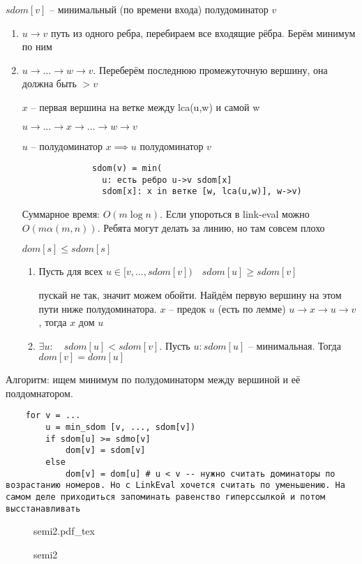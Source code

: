 \documentclass{book}
\theoremstyle{definition}
\newcommand{\incfig}[1]{%
    \def\svgwidth{\columnwidth}
    {#1.pdf_tex}
}
\begin{document}
$sdom[v]$ -- минимальный (по времени входа) полудоминатор  $v$

\begin{enumerate}
    \item $u\to v$ путь из одного ребра, перебираем все входящие рёбра. Берём минимум по ним
    \item $u\to \ldots\to w\to v$. Переберём последнюю промежуточную вершину, она должна быть $>v$

        $x$ -- первая вершина на ветке между lca(u,w) и самой w

         $u\to \ldots\to x\to \ldots\to w\to v$

         $u$ -- полудоминатор  $x \implies u$ полудоминатор $v$

          \begin{lstlisting}
              sdom(v) = min(
                u: есть ребро u->v sdom[x]
                sdom[x]: x in ветке [w, lca(u,w)], w->v)
          \end{lstlisting}          

          Суммарное время: $O\left( m\log n \right) $. Если упороться в link-eval можно $O\left( m \alpha(m,n) \right) $. Ребята могут делать за линию, но там совсем плохо

          $dom[s] \leqslant sdom[s]$

          \begin{enumerate}
              \item Пусть для всех $u\in [v, \ldots, sdom[v])\quad sdom[u] \geqslant  sdom[v]$

                  пускай не так, значит можем обойти. Найдём первую вершину на этом пути ниже полудоминатора. $x$ -- предок  $u$ (есть по лемме) $ u\to x\to u\to v$, тогда $x$ дом  $u$ 

              \item $\exists u:\quad sdom[u]<sdom[v]$. Пусть $u: sdom[u] $ -- минимальная. Тогда  $dom[v] = dom[u]$
          \end{enumerate}

\end{enumerate}
Алгоритм: ищем минимум по полудоминаторм между вершиной и её полдомнатором.

\begin{lstlisting}
    for v = ...
        u = min_sdom [v, ..., sdom[v])
        if sdom[u] >= sdmo[v]
            dom[v] = sdom[v]
        else
            dom[v] = dom[u] # u < v -- нужно считать доминаторы по возрастанию номеров. Но с LinkEval хочется считать по уменьшению. На самом деле приходиться запоминать равенство гиперссылкой и потом высстанавливать
\end{lstlisting}

\begin{figure}[!ht]
    \centering
    \incfig{semi2}
    \caption{semi2}
    \label{fig:semi2}
\end{figure}
\end{document}
